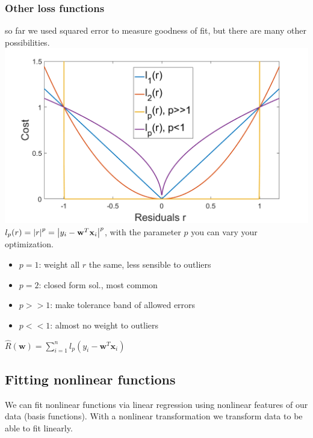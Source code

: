 \documentclass[a4paper, fontsize=8pt, landscape, DIV=1]{scrartcl}
\begin{document}
\begin{multicols*}{4}
		\subsubsection{Other loss functions}
		so far we used squared error to measure goodness of fit, but there are many other possibilities. 
		\includegraphics[width=\columnwidth]{images/Regression/loss_functions.png}
		$l_p(r)=\left\vert r\right\vert^p=\left\vert y_i-\textbf{w}^T\textbf{x}_i\right\vert^p$, with the parameter $p$ you can vary your optimization. 
		\begin{itemize}[noitemsep]
			\item $p=1$: weight all $r$ the same, less sensible to outliers 
			\item $p=2$: closed form sol., most common
			\item $p>>1$: make tolerance band of allowed errors
			\item $p<<1$: almost no weight to outliers
		\end{itemize}
		$\hat{R}(\textbf{w})=\sum_{i=1}^{n}l_p(y_i-\textbf{w}^T\textbf{x}_i)$
		\newpage 
		
		\subsection{Fitting nonlinear functions}
		We can fit nonlinear functions via linear regression using nonlinear features of our data (basis functions). With a nonlinear transformation we transform data to be able to fit linearly.\\
		
		
	\end{multicols*}
	\setcounter{secnumdepth}{3}
\end{document}
